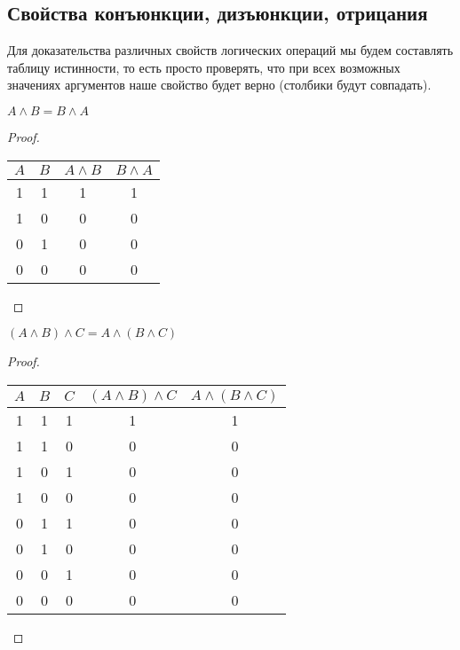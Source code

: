 \subsection{Свойства конъюнкции, дизъюнкции, отрицания}

\begin{remark}
	Для доказательства различных свойств логических операций мы будем составлять таблицу истинности, то есть просто проверять, что при всех возможных значениях аргументов наше свойство будет верно (столбики будут совпадать).
\end{remark}

\begin{theorem}
	$A \land B = B \land A$
\end{theorem}

\begin{proof}
	\hfill \break \break
	\begin{center}
		\begin{tabular}{ |c|c|c|c| } 
			\hline
			$A$ & $B$ & $A \land B $ & $B \land A$ \\
			\hline 
			1 & 1 & 1 & 1 \\ 
			1 & 0 & 0 & 0 \\
			0 & 1 & 0 & 0 \\ 
			0 & 0 & 0 & 0 \\  
			\hline
		\end{tabular}
	\end{center}
\end{proof}

\begin{theorem}
	$(A \land B) \land C = A \land (B \land C)$
\end{theorem}

\begin{proof}
	\hfill \break \break
	\begin{center}
		\begin{tabular}{ |c|c|c|c|c| } 
			\hline
			$A$ & $B$ & $C$ & $(A \land B) \land C$ & $A \land (B \land C)$ \\
			\hline 
			1 & 1 & 1 & 1 & 1 \\ 
			1 & 1 & 0 & 0 & 0 \\ 
			1 & 0 & 1 & 0 & 0 \\ 
			1 & 0 & 0 & 0 & 0 \\
			0 & 1 & 1 & 0 & 0 \\ 
			0 & 1 & 0 & 0 & 0 \\ 
			0 & 0 & 1 & 0 & 0 \\ 
			0 & 0 & 0 & 0 & 0 \\ 
			\hline
		\end{tabular}
	\end{center}
\end{proof}

